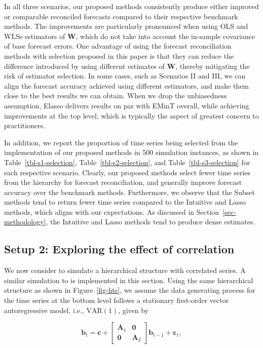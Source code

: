 \documentclass[11pt,a4paper,]{article}
\begin{document}
In all three scenarios, our proposed methods consistently produce either
improved or comparable reconciled forecasts compared to their respective
benchmark methods. The improvements are particularly pronounced when
using OLS and WLSs estimators of \(\boldsymbol{W}\), which do not take
into account the in-sample covariance of base forecast errors. One
advantage of using the forecast reconciliation methods with selection
proposed in this paper is that they can reduce the difference introduced
by using different estimates of \(\boldsymbol{W}\), thereby mitigating
the risk of estimator selection. In some cases, such as Scenarios II and
III, we can align the forecast accuracy achieved using different
estimators, and make them close to the best results we can obtain. When
we drop the unbiasedness assumption, Elasso delivers results on par with
EMinT overall, while achieving improvements at the top level, which is
typically the aspect of greatest concern to practitioners.

In addition, we report the proportion of time series being selected from
the implementation of our proposed methods in 500 simulation instances,
as shown in Table~\ref{tbl-s1-selection}, Table~\ref{tbl-s2-selection},
and Table~\ref{tbl-s3-selection} for each respective scenario. Clearly,
our proposed methods select fewer time series from the hierarchy for
forecast reconciliation, and generally improve forecast accuracy over
the benchmark methods. Furthermore, we observe that the Subset methods
tend to return fewer time series compared to the Intuitive and Lasso
methods, which aligns with our expectations. As discussed in
Section~\ref{sec-methodology}, the Intuitive and Lasso methods tend to
produce dense estimates.

\hypertarget{sec-sim2}{%
\subsection{Setup 2: Exploring the effect of
correlation}\label{sec-sim2}}

We now consider to simulate a hierarchical structure with correlated
series. A similar simulation to \textcite{Wickramasuriya2021-am} is
implemented in this section. Using the same hierarchical structure as
shown in Figure~\ref{fig-hts}, we assume the data generating process for
the time series at the bottom level follows a stationary first-order
vector autoregressive model, i.e., \(\text{VAR}(1)\), given by

\[
\boldsymbol{b}_t= \boldsymbol{c} + \left[\begin{array}{cc}
\boldsymbol{A}_1 & \boldsymbol{0} \\
\boldsymbol{0} & \boldsymbol{A}_2
\end{array}\right] \boldsymbol{b}_{t-1} + \boldsymbol{\varepsilon}_t,
\]
\end{document}
